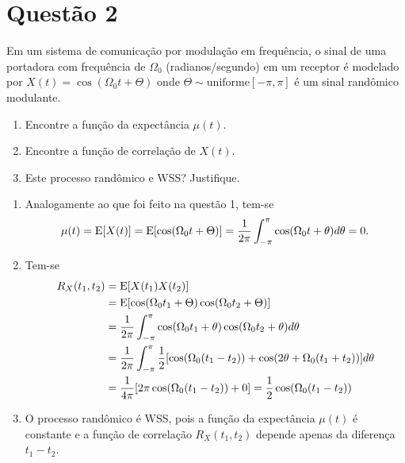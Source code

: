 \section{Questão 2}

Em um sistema de comunicação por modulação em frequência, o sinal de uma portadora com
frequência de $\Omega_0$ (radianos/segundo) em um receptor é modelado por
$X(t) = \cos(\Omega_0 t + \Theta)$
onde $\Theta \sim \text{uniforme}[-\pi, \pi]$ é um sinal randômico modulante.
%
\begin{enumerate}
    \item [a)] Encontre a função da expectância $\mu(t)$.
    \item [b)] Encontre a função de correlação de $X(t)$.
    \item [c)] Este processo randômico e WSS? Justifique.
\end{enumerate}

\begin{respostas}
\begin{enumerate}
    \item [a)] Analogamente ao que foi feito na questão 1, tem-se
    \begin{equation}
        \mu(t) 
        = \mathrm{E}\!\left[X(t)\right] = \mathrm{E}\!\left[\cos(\Omega_0 t + \Theta)\right]
        = \frac{1}{2\pi} \int_{-\pi}^{\pi} \cos(\Omega_0 t + \theta) d\theta
        = 0.
    \end{equation}

    \item [b)] Tem-se
    \begin{align}
        R_X(t_1, t_2) 
        &= \mathrm{E}\!\left[X(t_1) X(t_2)\right] \\
        &= \mathrm{E}\!\left[\cos(\Omega_0 t_1 + \Theta) \cos(\Omega_0 t_2 + \Theta)\right] \\
        &= \frac{1}{2\pi} \int_{-\pi}^{\pi} \cos(\Omega_0 t_1 + \theta) \cos(\Omega_0 t_2 + \theta) d\theta \\
        &= \frac{1}{2\pi} \int_{-\pi}^{\pi} \frac{1}{2} [\cos(\Omega_0 (t_1 - t_2)) + \cos(2\theta + \Omega_0 (t_1 + t_2))] d\theta \\
        &= \frac{1}{4\pi} [ 2\pi \cos(\Omega_0 (t_1 - t_2)) + 0 ] = \frac{1}{2} \cos(\Omega_0 (t_1 - t_2))
    \end{align}

    \item [c)] O processo randômico é WSS, pois a função da expectância $\mu(t)$ é constante e a função de correlação $R_X(t_1, t_2)$ depende apenas da diferença $t_1 - t_2$.
\end{enumerate}
\end{respostas}